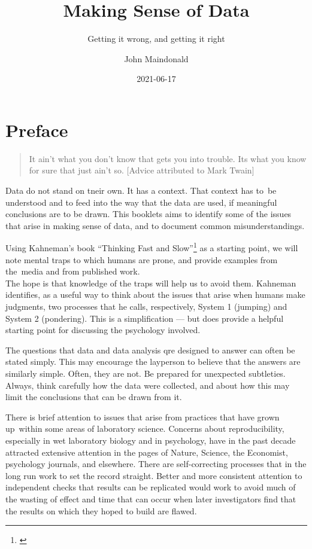 \documentclass[
  10pt,
  b5paper]{book}
\title{Making Sense of Data}
\subtitle{Getting it wrong, and getting it right}
\author{John Maindonald}
\date{2021-06-17}
\begin{document}
\maketitle

{
\hypersetup{linkcolor=}
\setcounter{tocdepth}{1}
\tableofcontents
}
\hypertarget{preface}{%
\chapter*{Preface}\label{preface}}

\begin{quote}
It ain't what you don't know that gets you into trouble.
Its what you know for sure that just ain't so.
{[}Advice attributed to Mark Twain{]}
\end{quote}

Data do not stand on tneir own. It has a context. That context has
to~be understood and to feed into the way that the data are used,
if meaningful conclusions are to be drawn. This booklets aims to
identify some of the issues that arise in making sense of data,
and to document common misunderstandings.

Using Kahneman's book ``Thinking Fast and Slow''\footnote{\citet{kahneman_2013}} as
a starting point, we will note mental traps to which humans are
prone, and provide examples from the~media and from published work.\\
The hope is that knowledge of the traps will help us to avoid them.
Kahneman identifies, as a useful way to think about the issues that
arise when humans make judgments, two processes that he
calls, respectively, System 1 (jumping) and System 2 (pondering).
This is a simplification --- but does provide a helpful
starting point for discussing the psychology involved.

The questions that data and data analysis qre designed to answer can often be stated simply. This may encourage the layperson to believe that the answers are similarly simple. Often, they are not. Be prepared for unexpected subtleties. Always, think carefully how the data were collected,
and about how this may limit the conclusions that can be drawn from it.

There is brief attention to issues that arise from practices that have
grown up~within some areas of laboratory science. Concerns about reproducibility, especially in wet laboratory biology and in psychology, have in the past decade attracted extensive attention in the pages of
Nature, Science, the Economist, psychology journals, and elsewhere.
There are self-correcting processes that in the long run work to
set the record straight. Better and more consistent attention to
independent checks that results can be replicated would work to avoid
much of the wasting of effect and time that can occur when later
investigators find that the results on which they hoped to build are
flawed.
\end{document}
